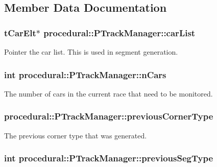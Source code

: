 \subsection{Member Data Documentation}
\hypertarget{classprocedural_1_1_p_track_manager_a48932e59eced9eb62718ce8115780498}{
\subsubsection[{car\-List}]{\setlength{\rightskip}{0pt plus 5cm}t\-Car\-Elt$\ast$ procedural\-::\-P\-Track\-Manager\-::car\-List\hspace{0.3cm}{\ttfamily [private]}}}\label{classprocedural_1_1_p_track_manager_a48932e59eced9eb62718ce8115780498}
Pointer the car list. This is used in segment generation. \hypertarget{classprocedural_1_1_p_track_manager_aa41cb2a5feacb95941e3769c16f303c9}{
\subsubsection[{n\-Cars}]{\setlength{\rightskip}{0pt plus 5cm}int procedural\-::\-P\-Track\-Manager\-::n\-Cars\hspace{0.3cm}{\ttfamily [private]}}}\label{classprocedural_1_1_p_track_manager_aa41cb2a5feacb95941e3769c16f303c9}
The number of cars in the current race that need to be monitored. \hypertarget{classprocedural_1_1_p_track_manager_a1e986c033a12a2b2cd602f28b1c27113}{
\subsubsection[{previous\-Corner\-Type}]{ procedural\-::\-P\-Track\-Manager\-::previous\-Corner\-Type\hspace{0.3cm}{\ttfamily [private]}}}\label{classprocedural_1_1_p_track_manager_a1e986c033a12a2b2cd602f28b1c27113}
The previous corner type that was generated. \hypertarget{classprocedural_1_1_p_track_manager_a9a2da179be6f3c15feb8cbda22f1b8c0}{
\subsubsection[{previous\-Seg\-Type}]{\setlength{\rightskip}{0pt plus 5cm}int procedural\-::\-P\-Track\-Manager\-::previous\-Seg\-Type\hspace{0.3cm}{\ttfamily [private]}}}\label{classprocedural_1_1_p_track_manager_a9a2da179be6f3c15feb8cbda22f1b8c0}
